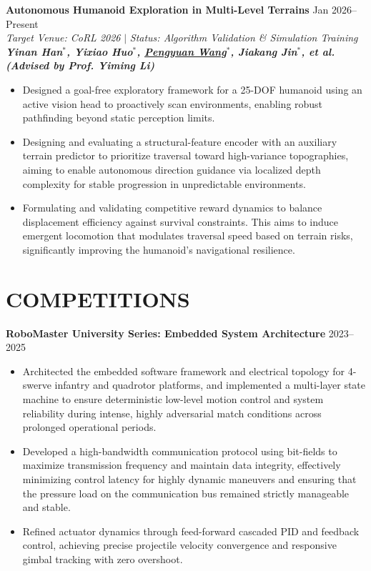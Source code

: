 \documentclass[a4paper,11pt]{article}
\begin{document}
\textcolor{titleblue}{\textbf{Autonomous Humanoid Exploration in Multi-Level Terrains}} \hfill Jan 2026--Present \\
\textit{Target Venue: CoRL 2026} $|$ \textit{Status: Algorithm Validation \& Simulation Training} \\
\textit{\textbf{Yinan Han$^*$, Yixiao Huo$^*$, \underline{Pengyuan Wang$^*$}, Jiakang Jin$^*$, et al. (Advised by Prof. Yiming Li)}}
\begin{itemize}[nosep,after=\strut, leftmargin=1.5em, itemsep=3pt,label=$\bullet$]
\item Designed a goal-free exploratory framework for a 25-DOF humanoid using an active vision head to proactively scan environments, enabling robust pathfinding beyond static perception limits.
\item Designing and evaluating a structural-feature encoder with an auxiliary terrain predictor to prioritize traversal toward high-variance topographies, aiming to enable autonomous direction guidance via localized depth complexity for stable progression in unpredictable environments.
\item Formulating and validating competitive reward dynamics to balance displacement efficiency against survival constraints. This aims to induce emergent locomotion that modulates traversal speed based on terrain risks, significantly improving the humanoid's navigational resilience.
\end{itemize}

\vspace{6pt}

\section{COMPETITIONS}

\textcolor{titleblue}{\textbf{RoboMaster University Series: Embedded System Architecture}} \hfill 2023--2025
\begin{itemize}[nosep,after=\strut, leftmargin=1.5em, itemsep=3pt,label=$\bullet$]
\item Architected the embedded software framework and electrical topology for 4-swerve infantry and quadrotor platforms, and implemented a multi-layer state machine to ensure deterministic low-level motion control and system reliability during intense, highly adversarial match conditions across prolonged operational periods.
\item Developed a high-bandwidth communication protocol using bit-fields to maximize transmission frequency and maintain data integrity, effectively minimizing control latency for highly dynamic maneuvers and ensuring that the pressure load on the communication bus remained strictly manageable and stable.
\item Refined actuator dynamics through feed-forward cascaded PID and feedback control, achieving precise projectile velocity convergence and responsive gimbal tracking with zero overshoot.
\end{itemize}
\end{document}
